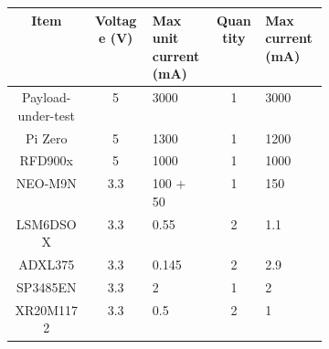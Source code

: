 \documentclass{report}
\begin{document}
\begin{table}[H]
  \centering
  \begin{tabular}{|c|c|p{0.2\linewidth}|c|p{0.2\linewidth}|}
    \hline
    \textbf{Item}                    & \textbf{Voltage (\si{\volt})} & \textbf{Max unit current (\si{\milli\ampere})} & \textbf{Quantity} & \textbf{Max current (\si{\milli\ampere})} \\
    \hline
    Payload-under-test               & 5                             & 3000                                           & 1                 & 3000                                      \\
    Pi Zero                          & 5                             & 1300 \cite{raspberry-pi-hardware-doc}          & 1                 & 1200                                      \\
    RFD900x                          & 5                             & 1000 \cite{rfdesign2020rfd900x}                & 1                 & 1000                                      \\
    NEO-M9N                          & 3.3                           & 100 + 50 \cite{ublox2023neo_m9n_datasheet}     & 1                 & 150                                       \\
    LSM6DSOX                         & 3.3                           & 0.55 \cite{lsm6dso-datasheet}                  & 2                 & 1.1                                       \\
    ADXL375                          & 3.3                           & 0.145 \cite{analog2014adxl375}                 & 2                 & 2.9                                       \\
    SP3485EN                         & 3.3                           & 2 \cite{maxlinear2021sp3485}                   & 1                 & 2                                         \\
    XR20M1172                        & 3.3                           & 0.5 \cite{maxlinear2022xr20m1172}              & 2                 & 1                                         \\

\end{tabular}
\end{table}
\end{document}
